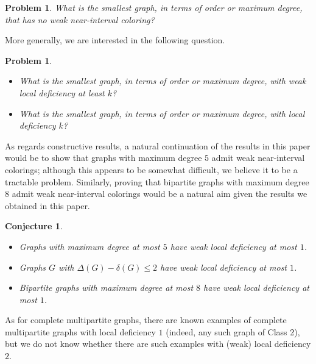 \documentclass[12pt]{article}
\theoremstyle{plain}
\newtheorem{conjecture}[theorem]{Conjecture}
\newtheorem{problem}[theorem]{Problem}
\theoremstyle{definition}
\numberwithin{equation}{section}
\begin{document}
\begin{problem}
	What is the smallest graph, in terms of order or maximum degree, that has no weak near-interval coloring?
\end{problem}


More generally, we are interested in the following question.

\begin{problem}
\begin{itemize}
	\item[(i)]	What is the smallest graph, in terms of order or maximum degree, 
	with weak local deficiency at least $k$?

	\item[(ii)] What is the smallest graph, in terms of order or maximum degree,
	with local deficiency $k$?
\end{itemize}
\end{problem}



As regards constructive results, a natural continuation of the results in this paper would be to show that
graphs with maximum degree $5$ admit weak near-interval colorings; although this appears to be
somewhat difficult, we believe it to be a tractable problem. Similarly, proving that bipartite graphs
with maximum degree $8$ admit weak near-interval colorings would be a natural aim given the results
we obtained in this paper. 

\begin{conjecture}
$\,$
\begin{itemize}

\item[(i)] Graphs with maximum degree at most $5$ have weak local deficiency at most $1$.

\item[(ii)] Graphs $G$ with $\Delta(G)-\delta(G)\leq 2$ have weak local deficiency at most $1$.

\item[(iii)] Bipartite graphs with maximum degree at most $8$ have weak local deficiency at most $1$.

\end{itemize}

\end{conjecture}


As for complete multipartite graphs, there are known examples
of complete multipartite graphs with local deficiency $1$ (indeed, any such graph of Class 2), 
but we do not know whether there
are such examples with (weak) local deficiency $2$.
\end{document}
